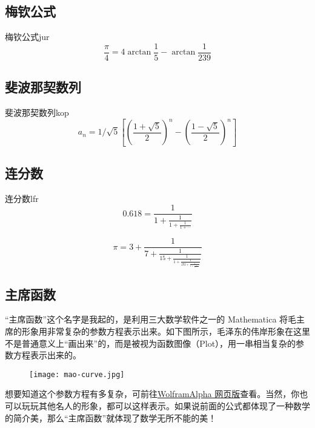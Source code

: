 \documentclass[12pt, cn]{elegantart}
\begin{document}
\subsection{梅钦公式}
\begin{theorem}{梅钦公式}{jur}
	\begin{equation}
		\frac{\pi}{4}=4 \arctan \frac{1}{5}-\arctan \frac{1}{239}
	\end{equation}
\end{theorem}

\subsection{斐波那契数列}

\begin{theorem}{斐波那契数列}{kop}
	\begin{equation}
		a_{n}=1 / \sqrt{5}\left[\left(\frac{1+\sqrt{5}}{2}\right)^{n}-\left(\frac{1-\sqrt{5}}{2}\right)^{n}\right]
	\end{equation}
\end{theorem}

\subsection{连分数}
\begin{theorem}{连分数}{lfr}
	\begin{equation}
	0.618=\frac{1}{1+\frac{1}{1+\frac{1}{1+\cdots}}}
	\end{equation}

	\begin{equation}
	\pi=3+\frac{1}{7+\frac{1}{15+\frac{1}{1+\frac{1}{292+\frac{1}{1+\frac{1}{1+\ddots}}}}}}
	\end{equation}
\end{theorem}

\subsection{主席函数}

“主席函数”这个名字是我起的，是利用三大数学软件之一的 Mathematica
将毛主席的形象用非常复杂的参数方程表示出来。如下图所示，毛泽东的伟岸形象在这里不是普通意义上“画出来”的，而是被视为函数图像（Plot），用一串相当复杂的参数方程表示出来的。

\begin{figure}[h]
\centering
\texttt{[image: mao-curve.jpg]}
\end{figure}

想要知道这个参数方程有多复杂，可前往\href{https://www.wolframalpha.com/input/?i=Mao+curve}{WolframAlpha 网页版}查看。当然，你也可以玩玩其他名人的形象，都可以这样表示。如果说前面的公式都体现了一种数学的简介美，那么“主席函数”就体现了数学无所不能的美！

\nocite{*}
{}

\vspace{1.5cm}


\clearpage

\end{document}
